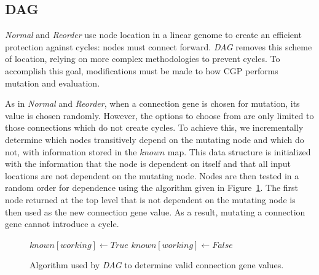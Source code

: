 \documentclass[journal]{IEEEtran}
\begin{document}
\subsection{DAG}
\label{sec:dag}
\emph{Normal} and \emph{Reorder} use node location in a linear genome to create
an efficient protection against cycles: nodes must connect forward.  \emph{DAG}
removes this scheme of location, relying on more complex methodologies to
prevent cycles.  To accomplish this goal, modifications must be made to how CGP
performs mutation and evaluation.

As in \emph{Normal} and \emph{Reorder}, when a connection gene is chosen for mutation, its value is chosen randomly.
However, the options to choose from are only limited to those connections which do not
create cycles.
To achieve this, we incrementally determine
which nodes transitively depend on the mutating node and which do not, with
information stored in the $known$ map.  This data structure is initialized with
the information that the node is dependent on itself and that all input locations
are not dependent on the mutating node.  Nodes are then
tested in a random order for dependence using the  algorithm given in Figure~\ref{fig:dag}.
The first node returned at the top level that is not dependent on the mutating node is then
used as the new connection gene value.  As a result, mutating a connection gene
cannot introduce a cycle.

\begin{figure}
  \begin{algorithmic}
      \State{}
    \EndIf
        \State $known[working] \leftarrow True$
        \State{}
      \EndIf
    \EndFor
    \State $known[working] \leftarrow False$
    \State{}
  \EndProcedure
  \end{algorithmic}
  \caption{Algorithm used by \emph{DAG} to determine valid connection gene values.}
  \label{fig:dag}
\end{figure}
\end{document}
